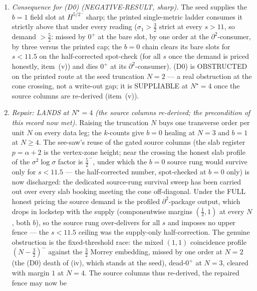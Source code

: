 \begin{remark}
\begin{enumerate}[label=\textup{(\roman*)},leftmargin=*,nosep]
  and the compact-slice setting is restored at zero cost on the flat cylinder
  $\mathbb R\times\mathbb T^3$ (real-analytic, globally hyperbolic, massive
  vacuum Hadamard; on a short collar the image sums are smooth and the
  $v_3\sigma^3\log\sigma$ term is unchanged).
\item \emph{Consequence for (D0) (NEGATIVE-RESULT, sharp).} The seed supplies
  the $b{=}1$ field slot at $H^{5/2^-}$ sharp; the printed single-metric
  ladder consumes it strictly above that under every reading
  ($\sigma_1>\tfrac32$ strict at every $s>11$, so demand $>\tfrac52$: missed
  by $0^+$ at the bare slot, by one order at the $\partial^2$-consumer, by
  three versus the printed cap; the $b{=}0$ chain clears its bare slots for
  $s<11.5$ on the half-corrected spot-check (for all $s$ once the demand is
  priced honestly, item~(v)) and dies $0^+$ at its $\partial^2$-consumer). (D0)
  is OBSTRUCTED on the printed route at the seed truncation $N{=}2$ --- a real
  obstruction at the cone crossing, not a write-out gap; it is SUPPLIABLE at
  $N^\star{=}4$ once the source columns are re-derived (item~(v)).
\item \emph{Repair: LANDS at $N^\star{=}4$ (the source columns re-derived; the
  precondition of this record now met).} Raising the truncation $N$ buys one
  transverse order per unit $N$ on every data leg; the $k$-counts give $b{=}0$
  healing at $N{=}3$ and $b{=}1$ at $N\ge4$. The see-saw's reuse of the gated
  source columns (the slab register $p=\alpha+2$ is the vertex-zone height;
  near the crossing the honest slab profile of the $\sigma^2\log\sigma$ factor
  is $\tfrac52^-$, under which the $b{=}0$ source rung would survive only for
  $s<11.5$ --- the half-corrected number, spot-checked at $b{=}0$ only) is now
  discharged: the dedicated source-rung survival sweep has been carried out
  over every slab booking meeting the cone off-diagonal. Under the FULL honest
  pricing the source demand is the profiled $\partial^2$-package output, which
  drops in lockstep with the supply (componentwise margins $(\tfrac12,1)$ at
  every $N$, both $b$), so the source rung over-delivers for all $s$ and
  imposes no upper fence --- the $s<11.5$ ceiling was the supply-only
  half-correction. The genuine obstruction is the fixed-threshold race: the
  mixed $(1,1)$ coincidence profile $(N-\tfrac32)^-$ against the $\tfrac32$
  Morrey embedding, missed by one order at $N{=}2$ (the (D0) death of (iv),
  which stands at the seed), dead-$0^+$ at $N{=}3$, cleared with margin $1$ at
  $N{=}4$. The source columns thus re-derived, the repaired fence may now be

\end{enumerate}
\end{remark}
